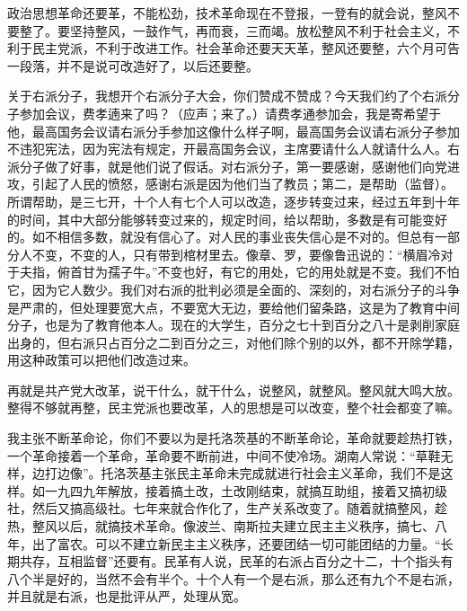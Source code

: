政治思想革命还要革，不能松劲，技术革命现在不登报，一登有的就会说，整风不要整了。要坚持整风，一鼓作气，再而衰，三而竭。放松整风不利于社会主义，不利于民主党派，不利于改进工作。社会革命还要天天革，整风还要整，六个月可告一段落，并不是说可改造好了，以后还要整。

关于右派分子，我想开个右派分子大会，你们赞成不赞成？今天我们约了个右派分子参加会议，费孝遖来了吗？（应声；来了。）请费孝通参加会，我是寄希望于他，最高国务会议请右派分手参加这像什么样子啊，最高国务会议请右派分子参加不违犯宪法，因为宪法有规定，开最高国务会议，主席要请什么人就请什么人。右派分子做了好事，就是他们说了假话。对右派分子，第一要感谢，感谢他们向党进攻，引起了人民的愤怒，感谢右派是因为他们当了教员；第二，是帮助（监督）。所谓帮助，是三七开，十个人有七个人可以改造，逐步转变过来，经过五年到十年的时间，其中大部分能够转变过来的，规定时间，给以帮助，多数是有可能变好的。如不相信多数，就没有信心了。对人民的事业丧失信心是不对的。但总有一部分人不变，不变的人，只有带到棺材里去。像章、罗，要像鲁迅说的：“横眉冷对于夫指，俯首甘为孺子牛。”不变也好，有它的用处，它的用处就是不变。我们不怕它，因为它人数少。我们对右派的批判必须是全面的、深刻的，对右派分子的斗争是严肃的，但处理要宽大点，不要宽大无边，要给他们留条路，这是为了教育中间分子，也是为了教育他本人。现在的大学生，百分之七十到百分之八十是剥削家庭出身的，但右派只占百分之二到百分之三，对他们除个别的以外，都不开除学籍，用这种政策可以把他们改造过来。

再就是共产党大改革，说干什么，就干什么，说整风，就整风。整风就大鸣大放。整得不够就再整，民主党派也要改革，人的思想是可以改变，整个社会都变了嘛。

我主张不断革命论，你们不要以为是托洛茨基的不断革命论，革命就要趁热打铁，一个革命接着一个革命，革命要不断前进，中间不使冷场。湖南人常说：“草鞋无样，边打边像”。托洛茨基主张民主革命未完成就进行社会主义革命，我们不是这样。如一九四九年解放，接着搞土改，土改刚结束，就搞互助组，接着又搞初级社，然后又搞高级社。七年来就合作化了，生产关系改变了。随着就搞整风，趁热，整风以后，就搞技术革命。像波兰、南斯拉夫建立民主主义秩序，搞七、八年，出了富农。可以不建立新民主主义秩序，还要团结一切可能团结的力量。“长期共存，互相监督”还要有。民革有人说，民革的右派占百分之十二，十个指头有八个半是好的，当然不会有半个。十个人有一个是右派，那么还有九个不是右派，并且就是右派，也是批评从严，处理从宽。

